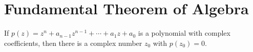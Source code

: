 \newpage

\section{Fundamental Theorem of Algebra}\label{fundamentalthmofalgebra}

\begin{theorem}
If $p(z) = z^n + a_{n-1}z^{n-1}+ \cdots + a_1z + a_0$ is a polynomial with complex coefficients, then there is a complex number $z_0$ with $p(z_0) = 0$.
\end{theorem}






